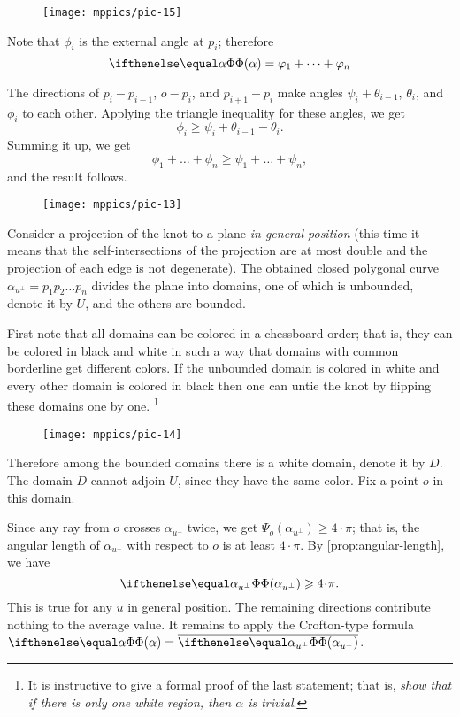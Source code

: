 \begin{wrapfigure}{r}{45 mm}
\vskip-0mm
\centering
\texttt{[image: mppics/pic-15]}
\vskip0mm
\end{wrapfigure}

Note that $\phi_i$ is the external angle at $p_i$;
therefore 
\[\tc\alpha= \phi_1+\dots+\phi_n\]

The directions of $p_i-p_{i-1}$, $o-p_i$, and $p_{i+1}-p_i$ make angles 
$\psi_i+\theta_{i-1}$, $\theta_i$, and $\phi_i$ to each other.
Applying the triangle inequality for these angles, we get
\[\phi_i\ge \psi_i+\theta_{i-1}-\theta_i.\]
Summing it up, we get
\[\phi_1+\dots+\phi_n\ge \psi_1+\dots+\psi_n,\]
and the result follows.
\qeds


\begin{wrapfigure}{r}{44 mm}
\vskip-0mm
\centering
\texttt{[image: mppics/pic-13]}
\vskip0mm
\end{wrapfigure}

Consider a projection of the knot to a plane \emph{in general position}
(this time it means that the self-intersections of the projection are at most double and the projection of each edge is not degenerate).
The obtained closed polygonal curve $\alpha_{u^\perp}=p_1p_2\dots p_n$ divides the plane into domains, one of which is unbounded, denote it by $U$, and the others are bounded.

First note that all domains can be colored in a chessboard order;
that is, they can be colored in black and white in such a way that domains with common borderline get different colors.
If the unbounded domain is colored in white and every other domain is colored in black then one can untie the knot by flipping these domains one by one.%
\footnote{It is instructive to give a formal proof of the last statement; that is, \textit{show that if there is only one white region, then $\alpha$ is trivial}.}


\begin{wrapfigure}{r}{44 mm}
\vskip-4mm
\centering
\texttt{[image: mppics/pic-14]}
\vskip0mm
\end{wrapfigure}

Therefore among the bounded domains there is a white domain, denote it by $D$.
The domain $D$ cannot adjoin %
$U$, since they have the same color.
Fix a point $o$ in this domain.

Since any ray from $o$ crosses $\alpha_{u^\perp}$ twice, we get $\Psi_o(\alpha_{u^\perp})\ge 4\cdot\pi$;
that is, the angular length of $\alpha_{u^\perp}$ with respect to $o$ is at least $4\cdot\pi$. 
By \ref{prop:angular-length}, we have 
\[\tc{\alpha_{u^\perp}}\ge4\cdot\pi.\]
This is true for any $u$ in general position.
The remaining directions contribute nothing to the average value.
It remains to apply the Crofton-type formula $\tc{\alpha}=\overline{\tc{\alpha_{u^\perp}}}$.
\qeds
